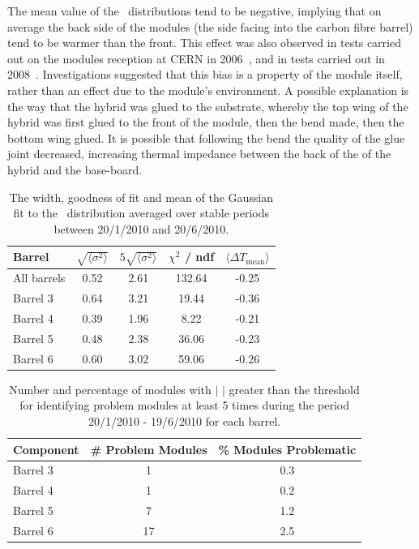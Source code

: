 The mean value of the \deltat\ distributions tend to be negative, implying that
on average the back side of the modules (the side facing into the carbon fibre
barrel) tend to be warmer than the front. This effect was also observed in tests
carried out on the modules reception at CERN in 2006~\cite{Viehhauser:2006ix},
and in tests carried out in 2008~\cite{Shaw:1229428}. Investigations suggested
that this bias is a property of the module itself, rather than an effect due to
the module's environment. A possible explanation is the way that the hybrid was
glued to the substrate, whereby the top wing of the hybrid was first glued to the front of the
module, then the bend made, then the bottom wing glued. It is possible that
following the bend the quality of the glue joint decreased, increasing thermal
impedance between the back of the of the hybrid and the base-board.

\begin{table}
\centering
\begin{tabular}{ l  c  c  c  c }
\hline\hline
Barrel & $\sqrt{\langle \sigma ^ 2 \rangle }$ & $5\sqrt{\langle \sigma ^ 2 \rangle }$ & $\chi ^2 $  / ndf & $\langle \Delta T_{\mathrm{mean}} \rangle$ \\
\hline
All barrels & 0.52 & 2.61 & 132.64 & -0.25\\
Barrel 3 & 0.64 & 3.21 & 19.44 & -0.36 \\
Barrel 4 & 0.39 & 1.96 & 8.22 & -0.21 \\
Barrel 5 & 0.48 & 2.38 & 36.06 & -0.23 \\
Barrel 6 & 0.60 & 3.02 & 59.06 & -0.26 \\
\hline\hline
\end{tabular}
 \caption{The width, goodness of fit and mean of the Gaussian fit to the
 \deltat\ distribution averaged over stable periods between 20/1/2010 and 20/6/2010.}
	\label{table:dt_thresh}

\end{table}

\begin{table}
\centering
 \begin{tabular}{  l  c  c }
\hline\hline
Component & \# Problem Modules & \% Modules Problematic \\
\hline
Barrel 3 & 1 & 0.3 \\
Barrel 4 & 1 & 0.2 \\
Barrel 5 & 7 & 1.2 \\
Barrel 6 & 17 & 2.5 \\
\hline\hline
\end{tabular}
\caption{Number and percentage of modules with $|$ \deltat$|$ greater than the
threshold for identifying problem modules at least 5 times during the period
20/1/2010 - 19/6/2010 for each barrel.}
\label{table:dt_num}
\end{table}

